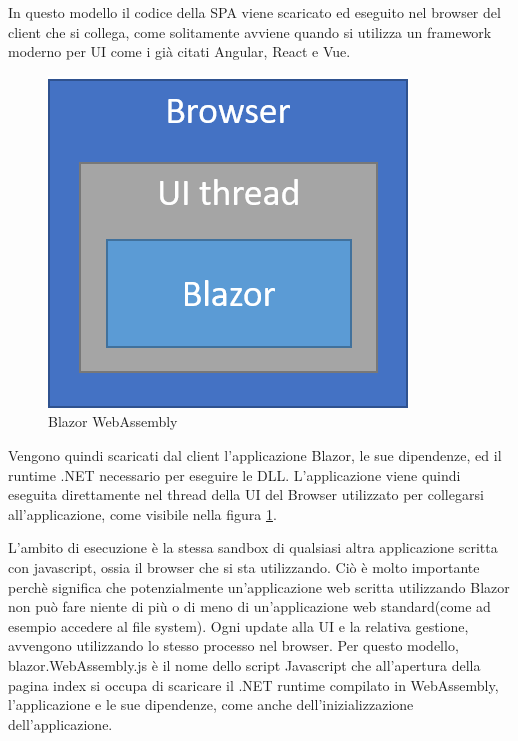 In questo modello il codice della SPA viene scaricato ed eseguito nel browser del client che si collega, come solitamente avviene quando si utilizza un framework moderno per UI come i gi\`a citati Angular, React e Vue.

\begin{figure}[H]
	\centerline{\includegraphics[scale=0.6]{figure/blazor-WebAssembly.png}}
	\caption{Blazor WebAssembly}
	\label{fig:BlazorWebAssembly}
\end{figure}

Vengono quindi scaricati dal client l'applicazione Blazor, le sue dipendenze, ed il runtime .NET necessario per eseguire le DLL.
L'applicazione viene quindi eseguita direttamente nel thread della UI del Browser utilizzato per collegarsi all'applicazione, come visibile nella figura \ref{fig:BlazorWebAssembly}.

L'ambito di esecuzione \`e la stessa sandbox di qualsiasi altra applicazione scritta con javascript, ossia il browser che si sta utilizzando.
Ci\`o \`e molto importante perch\`e significa che potenzialmente un'applicazione web scritta utilizzando Blazor non pu\`o fare niente di pi\`u o di meno di un'applicazione web standard(come ad esempio accedere al file system).
Ogni update alla UI e la relativa gestione, avvengono utilizzando lo stesso processo nel browser.
Per questo modello, blazor.WebAssembly.js \`e il nome dello script Javascript che all'apertura della pagina index si occupa di scaricare il .NET runtime compilato in WebAssembly, l'applicazione e le sue dipendenze, come anche dell'inizializzazione dell'applicazione.

